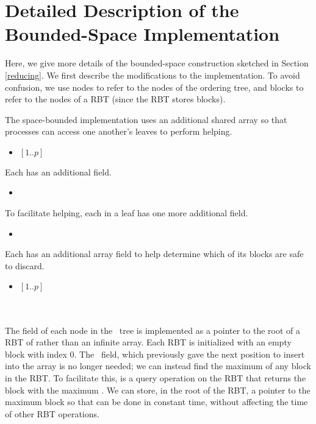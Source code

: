 
\section{Detailed Description of the Bounded-Space Implementation}
\label{reducing-details}


\renewcommand{\algorithmiccomment}[1]{\hfill\eqparbox{COMMENTSINGLEAPP}{\com\ #1}}

Here, we give more details of the bounded-space construction sketched in Section \ref{reducing}.
We first describe the modifications to the implementation.
To avoid confusion, we use nodes to refer to the nodes of the ordering tree, and blocks to refer
to the nodes of a RBT (since the RBT stores blocks).

The space-bounded implementation uses an additional shared array so that processes can access one another's leaves to perform helping.
\begin{itemize}
\item {} $[1..p]$ 
\end{itemize}
Each  has an additional field.
\begin{itemize}
\item {}  
\end{itemize}
To facilitate helping, each  in a leaf has one more additional field.
\begin{itemize}
\item {}  
\end{itemize}
Each  has an additional array field to help determine which of its blocks are safe to discard.
\begin{itemize}
\item {} $[1..p]$ \\
\mbox{ }\\
\mbox{ }
\end{itemize}
The  field of each node in the \ordering\ tree is implemented as a pointer to the root of a RBT of  rather than an infinite array.  
Each RBT is initialized with an empty block with index 0.
The \head\ field, which previously gave the next position to insert into the  array is no
longer needed; we can instead find the maximum  of any block in the RBT.
To facilitate this,  is a query operation on the RBT that 
returns the block with the maximum .
We can store, in the root of the RBT, a pointer to the maximum block so that 
can be done in constant time, without affecting the time of other RBT operations.

